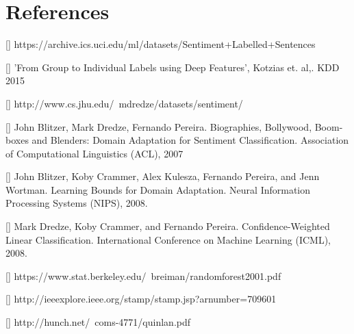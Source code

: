 \documentclass{article} %
\begin{document}
\section{References}

[] https://archive.ics.uci.edu/ml/datasets/Sentiment+Labelled+Sentences

[] 'From Group to Individual Labels using Deep Features', Kotzias et. al,. KDD 2015

[] http://www.cs.jhu.edu/~mdredze/datasets/sentiment/

[] John Blitzer, Mark Dredze, Fernando Pereira. Biographies, Bollywood, Boom-boxes and Blenders: Domain Adaptation for Sentiment Classification. Association of Computational Linguistics (ACL), 2007

[] John Blitzer, Koby Crammer, Alex Kulesza, Fernando Pereira, and Jenn Wortman. Learning Bounds for Domain Adaptation. Neural Information Processing Systems (NIPS), 2008.

[] Mark Dredze, Koby Crammer, and Fernando Pereira. Confidence-Weighted Linear Classification. International Conference on Machine Learning (ICML), 2008.

[] https://www.stat.berkeley.edu/~breiman/randomforest2001.pdf

[] http://ieeexplore.ieee.org/stamp/stamp.jsp?arnumber=709601

[] http://hunch.net/~coms-4771/quinlan.pdf



\end{document}
